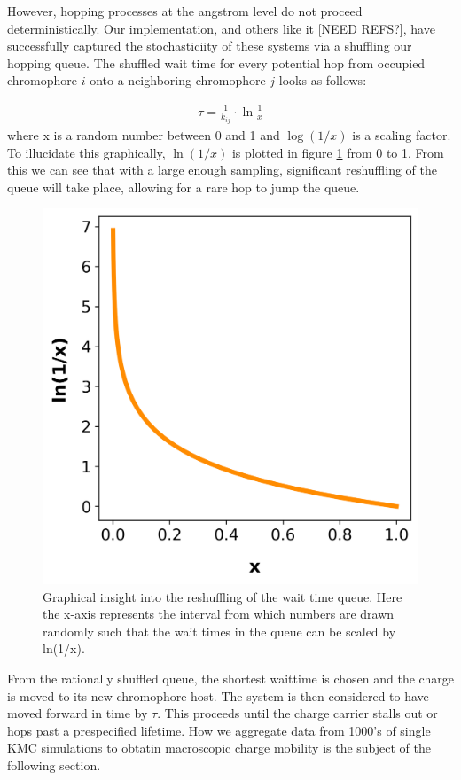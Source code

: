 However, hopping processes at the angstrom level do not proceed deterministically. 
Our implementation, and others like it [NEED REFS?], have
successfully captured the stochasticiity of these systems via a shuffling our hopping queue.
The shuffled wait time for every potential hop from occupied chromophore $i$ onto a
neighboring chromophore $j$ looks as follows:

\begin{align}
    \tau = \frac{1}{k_{ij}} \cdot \ln{\frac{1}{x}} 
    \label{waittime}
\end{align}
where x is a random number between 0 and 1 and $\log{(1/x)}$ is a scaling factor. To illucidate this
graphically, $\ln{(1/x)}$ is plotted in figure \ref{fig:ln} from 0 to 1. From this we can see that with
a large enough sampling, significant reshuffling of the queue will take place, allowing for a rare hop to jump
the queue.

\begin{figure}
  \center
  \includegraphics[width=0.8\linewidth]{figures/naturallog.png}
  \caption{Graphical insight into the reshuffling of the wait time queue. Here the x-axis represents the 
    interval from which numbers are drawn randomly such that the wait times in the queue can be scaled 
    by ln(1/x).}
  \label{fig:ln}
\end{figure}

From the rationally shuffled queue, the shortest waittime is chosen and the charge is moved to
its new chromophore host. The system is then considered to have moved forward in time by $\tau$. This proceeds
until the charge carrier stalls out or hops past a prespecified lifetime. How we aggregate data from 1000's of
single KMC simulations to obtatin macroscopic charge mobility is the subject of the following section.



